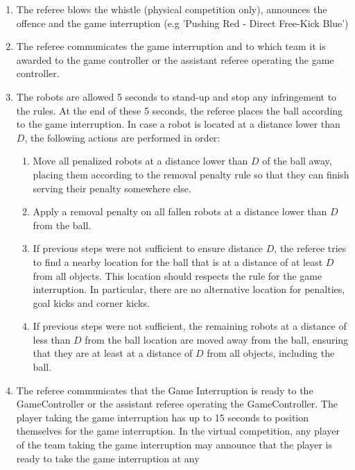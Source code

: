 \begin{enumerate}
\item The referee blows the whistle (physical competition only), announces the offence and the
      game interruption
      (e.g 'Pushing Red - Direct Free-Kick Blue')
\item
  The referee communicates the game interruption and to which team it is
    awarded to the game controller or the assistant referee operating the game controller.
\item   The robots are allowed 5 seconds to stand-up and stop any infringement
        to the rules.
        At the end of these 5 seconds, the referee places the ball according to
        the game interruption.
        In case a robot is located at a distance lower than $D$, the following
        actions are performed in order:
        \begin{enumerate}
        \item Move all penalized robots at a distance lower than $D$ of the ball
          away, placing them according to the removal penalty rule so that they
          can finish serving their penalty somewhere else.
        \item Apply a removal penalty on all fallen robots at a distance lower
          than $D$ from the ball.
        \item If previous steps were not sufficient to ensure distance $D$, the
          referee tries to find a nearby location for the ball that is at a
          distance of at least $D$ from all objects.
          This location should respects the rule for the game interruption.
          In particular, there are no alternative location for penalties, goal
          kicks and corner kicks.
        \item If previous steps were not sufficient, the remaining robots
          at a distance of less than $D$ from the ball location are moved away
          from the ball, ensuring that they are at least at a distance of $D$
          from all objects, including the ball.
        \end{enumerate}
\item
        The referee communicates that the Game Interruption is ready to the
        GameController or the assistant referee operating the GameController.
      The player taking the game interruption has up
      to 15 seconds to position themselves for the
      game interruption.
      In the virtual competition, any player of the team taking the
      game interruption may announce that the player
      is ready to take the game interruption at any

\end{enumerate}
